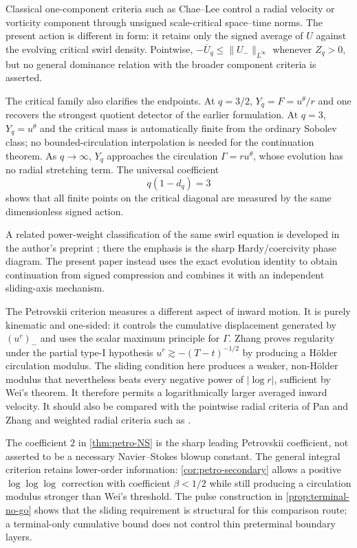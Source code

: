 \documentclass[11pt]{article}
\numberwithin{equation}{section}
\theoremstyle{definition}
\begin{document}
Classical one-component criteria such as Chae--Lee \cite{ChaeLee2002} control a radial velocity or vorticity component through unsigned scale-critical space--time norms.  The present action is different in form: it retains only the signed average of $U$ against the evolving critical swirl density.  Pointwise, $-\overline U_q\le\|U_-\|_{L^\infty}$ whenever $Z_q>0$, but no general dominance relation with the broader component criteria is asserted.

The critical family also clarifies the endpoints.  At $q=3/2$, $Y_q=F=u^\theta/r$ and one recovers the strongest quotient detector of the earlier formulation.  At $q=3$, $Y_q=u^\theta$ and the critical mass is automatically finite from the ordinary Sobolev class; no bounded-circulation interpolation is needed for the continuation theorem.  As $q\to\infty$, $Y_q$ approaches the circulation $\Gamma=ru^\theta$, whose evolution has no radial stretching term.  The universal coefficient
\[
 q(1-d_q)=3
\]
shows that all finite points on the critical diagonal are measured by the same dimensionless signed action.

A related power-weight classification of the same swirl equation is developed in the author's preprint \cite{ShahmurovHardy2026}; there the emphasis is the sharp Hardy/coercivity phase diagram.  The present paper instead uses the exact evolution identity to obtain continuation from signed compression and combines it with an independent sliding-axis mechanism.

The Petrovskii criterion measures a different aspect of inward motion.  It is purely kinematic and one-sided: it controls the cumulative displacement generated by $(u^r)_-$ and uses the scalar maximum principle for $\Gamma$.  Zhang \cite{Zhang2026} proves regularity under the partial type-I hypothesis $u^r\gtrsim-(T-t)^{-1/2}$ by producing a H\"older circulation modulus.  The sliding condition here produces a weaker, non-H\"older modulus that nevertheless beats every negative power of $|\log r|$, sufficient by Wei's theorem.  It therefore permits a logarithmically larger averaged inward velocity.  It should also be compared with the pointwise radial criteria of Pan and Zhang \cite{Pan2017,ZujinZhang2018} and weighted radial criteria such as \cite{RenclawowiczZajaczkowski2019}.

The coefficient $2$ in \cref{thm:petro-NS} is the sharp leading Petrovskii coefficient, not asserted to be a necessary Navier--Stokes blowup constant.  The general integral criterion retains lower-order information: \cref{cor:petro-secondary} allows a positive $\log\log\log$ correction with coefficient $\beta<1/2$ while still producing a circulation modulus stronger than Wei's threshold.  The pulse construction in \cref{prop:terminal-no-go} shows that the sliding requirement is structural for this comparison route; a terminal-only cumulative bound does not control thin preterminal boundary layers.
\end{document}
